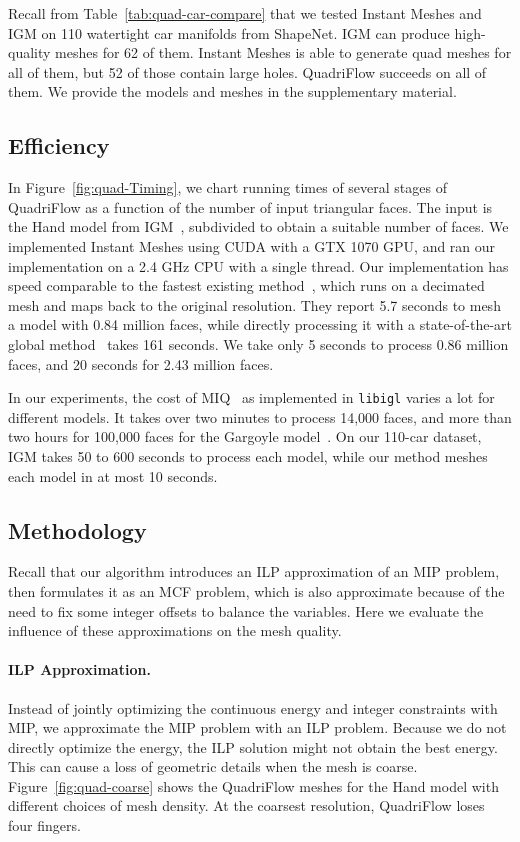 Recall from Table~\ref{tab:quad-car-compare} that we tested Instant Meshes and IGM on 110 watertight car manifolds from ShapeNet. IGM can produce high-quality meshes for 62 of them. Instant Meshes is able to generate quad meshes for all of them, but 52 of those contain large holes. QuadriFlow succeeds on all of them. We provide the models and meshes in the supplementary material.

\subsection{Efficiency}

In Figure~\ref{fig:quad-Timing}, we chart running times of several stages of QuadriFlow as a function of the number of input triangular faces. The input is the Hand model from IGM~\cite{bommes2013integer}, subdivided to obtain a suitable number of faces. We implemented Instant Meshes using CUDA with a GTX 1070 GPU, and ran our implementation on a 2.4 GHz CPU with a single thread. Our implementation has speed comparable to the fastest existing method~\cite{ebke2016interactively}, which runs on a decimated mesh and maps back to the original resolution. They report 5.7 seconds to mesh a model with 0.84 million faces, while directly processing it with a state-of-the-art global method~\cite{ebke2014level} takes 161 seconds. We take only 5 seconds to process 0.86 million faces, and 20 seconds for 2.43 million faces.

In our experiments, the cost of MIQ~\cite{bommes2009mixed} as implemented in \texttt{libigl} varies a lot for different models. It takes over two minutes to process 14,000 faces, and more than two hours for 100,000 faces for the Gargoyle model~\cite{tarini2010practical}. On our 110-car dataset, IGM takes 50 to 600 seconds to process each model, while our method meshes each model in at most 10 seconds.

\subsection{Methodology}
\label{sec:quad-methodology}

Recall that our algorithm introduces an ILP approximation of an MIP problem, then formulates it as an MCF problem, which is also approximate because of the need to fix some integer offsets to balance the variables. Here we evaluate the influence of these approximations on the mesh quality.

\paragraph*{ILP Approximation.} Instead of jointly optimizing the continuous energy and integer constraints with MIP, we approximate the MIP problem with an ILP problem. Because we do not directly optimize the energy, the ILP solution might not obtain the best energy. This can cause a loss of geometric details when the mesh is coarse. Figure~\ref{fig:quad-coarse} shows the QuadriFlow meshes for the Hand model with different choices of mesh density. At the coarsest resolution, QuadriFlow loses four fingers.

